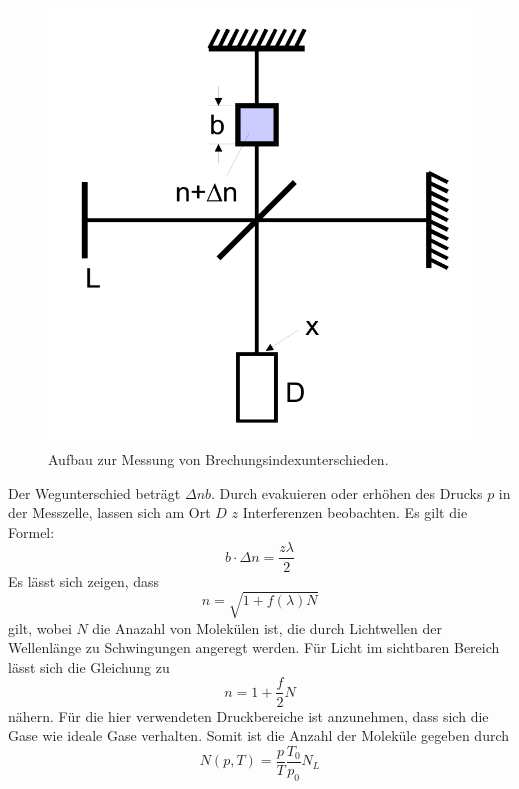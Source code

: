 \begin{figure}
    \centering
    \includegraphics{data/abb3.png}
    \caption{Aufbau zur Messung von Brechungsindexunterschieden.}
    \label{fig:abb3}
\end{figure}
\FloatBarrier
Der Wegunterschied beträgt $\Delta n b$.
Durch evakuieren oder erhöhen des Drucks $p$ in der Messzelle, lassen sich am Ort $D$ $z$ Interferenzen beobachten.
Es gilt die Formel:
\begin{equation}
    b \cdot \Delta n = \frac{z \lambda}{2}
    \label{eqn:theo3}
\end{equation}
Es lässt sich zeigen, dass
\begin{equation}
    n = \sqrt{1+f(\lambda)N}
\end{equation}
gilt, wobei $N$ die Anazahl von Molekülen ist, die durch Lichtwellen der Wellenlänge zu Schwingungen angeregt werden.
Für Licht im sichtbaren Bereich lässt sich die Gleichung zu
\begin{equation}
    n = 1 + \frac{f}{2}N
\end{equation}
nähern.
Für die hier verwendeten Druckbereiche ist anzunehmen, dass sich die Gase wie ideale Gase verhalten.
Somit ist die Anzahl der Moleküle gegeben durch
\begin{equation}
    N(p,T) = \frac{p}{T} \frac{T_0}{p_0}N_L
\end{equation}
